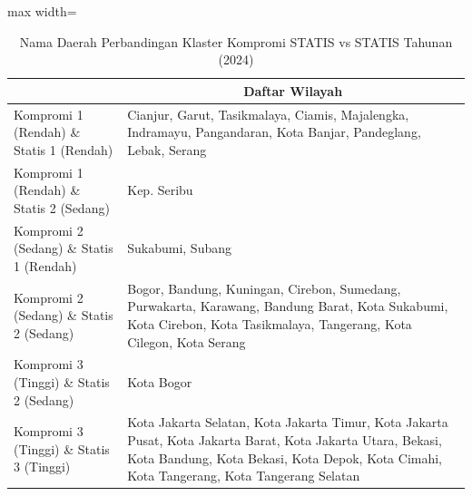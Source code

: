 \begin{table}[H]
\centering
\caption{Nama Daerah Perbandingan Klaster Kompromi STATIS vs STATIS Tahunan (2024)} \label{tab:app2comp_statis_name_2024}
\begin{adjustbox}{max width=\textwidth}
\begin{tabular}{|>{\centering\arraybackslash}p{4cm}|p{10cm}|}
\hline
\multicolumn{1}{|c|}{\textbf{Kategori}} & \multicolumn{1}{c|}{\textbf{Daftar Wilayah}} \\
\hline
Kompromi 1 (Rendah) \& Statis 1 (Rendah) & Cianjur, Garut, Tasikmalaya, Ciamis, Majalengka, Indramayu, Pangandaran, Kota Banjar, Pandeglang, Lebak, Serang \\
\hline
Kompromi 1 (Rendah) \& Statis 2 (Sedang) & Kep. Seribu \\
\hline
Kompromi 2 (Sedang) \& Statis 1 (Rendah) & Sukabumi, Subang \\
\hline
Kompromi 2 (Sedang) \& Statis 2 (Sedang) & Bogor, Bandung, Kuningan, Cirebon, Sumedang, Purwakarta, Karawang, Bandung Barat, Kota Sukabumi, Kota Cirebon, Kota Tasikmalaya, Tangerang, Kota Cilegon, Kota Serang \\
\hline
Kompromi 3 (Tinggi) \& Statis 2 (Sedang) & Kota Bogor \\
\hline
Kompromi 3 (Tinggi) \& Statis 3 (Tinggi) & Kota Jakarta Selatan, Kota Jakarta Timur, Kota Jakarta Pusat, Kota Jakarta Barat, Kota Jakarta Utara, Bekasi, Kota Bandung, Kota Bekasi, Kota Depok, Kota Cimahi, Kota Tangerang, Kota Tangerang Selatan \\
\hline
\end{tabular}
\end{adjustbox}
\end{table}